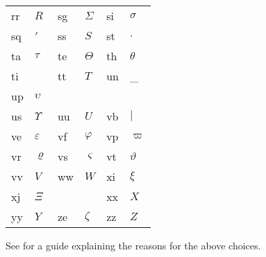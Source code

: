 \begin{table}[tbph]
\begin{center}
\begin{tabular}{||p{1.5cm}|p{4cm}||p{1.5cm}|p{4cm}||p{1.5cm}|p{4cm}||}
rr & $R$ & sg & $\Sigma$ & si & $\sigma$ \\
sq & $'$ & ss & $S$ & st & $.$ \\
ta & $\tau$ & te & $\Theta$ & th & $\theta$ \\
ti & $~$ & tt & $T$ & un & \_ \\
up & $\upsilon$ && && \\
us & $\Upsilon$ & uu & $U$ & vb & $|$ \\
ve & $\varepsilon$ & vf & $\varphi$ & vp & $\varpi$ \\
vr & $\varrho$ & vs & $\varsigma$ & vt & $\vartheta$ \\
vv & $V$ & ww & $W$ & xi & $\xi$ \\
xj & $\Xi$ & & & xx & $X$ \\
yy & $Y$ & ze & $\zeta$ & zz & $Z$ \\
\hline
\end{tabular}
See  for a guide explaining the reasons for the above choices.
\end{center}
\end{table}
